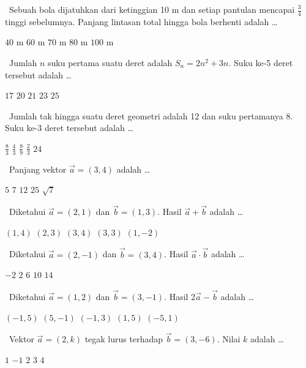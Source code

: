 \documentclass[11pt,a4paper]{exam}
\newcommand{\Fund}{{\footnotesize\textsf{\textcolor{hijau}{[Fundamental]}}}\ }
\newcommand{\Inter}{{\footnotesize\textsf{\textcolor{biru}{[Intermediate]}}}\ }
\newcommand{\Adv}{{\footnotesize\textsf{\textcolor{oranye}{[Advanced]}}}\ }
\newcommand{\Exp}{{\footnotesize\textsf{\textcolor{ungu}{[Expert]}}}\ }
\newcommand{\topik}[1]{%
  \par\addvspace{14pt}%
  \noindent{\large\bfseries\color{biru}#1}\par\addvspace{6pt}}
\begin{document}
\begin{questions}
\question \Adv Sebuah bola dijatuhkan dari ketinggian 10 m dan setiap pantulan
mencapai $\tfrac{3}{4}$ tinggi sebelumnya. Panjang lintasan total hingga bola
berhenti adalah \dots
\begin{choices}
\choice $40$ m \choice $60$ m \CorrectChoice $70$ m \choice $80$ m \choice $100$ m
\end{choices}

\question \Adv Jumlah $n$ suku pertama suatu deret adalah $S_n = 2n^{2} + 3n$.
Suku ke-5 deret tersebut adalah \dots
\begin{choices}
\choice $17$ \choice $20$ \CorrectChoice $21$ \choice $23$ \choice $25$
\end{choices}

\question \Exp Jumlah tak hingga suatu deret geometri adalah 12 dan suku
pertamanya 8. Suku ke-3 deret tersebut adalah \dots
\begin{choices}
\choice $\tfrac{8}{3}$ \choice $\tfrac{4}{3}$ \CorrectChoice $\tfrac{8}{9}$
\choice $\tfrac{2}{3}$ \choice $24$
\end{choices}

\topik{3. Vektor (8 Soal)}

\question \Fund Panjang vektor $\vec{a} = (3,4)$ adalah \dots
\begin{choices}
\CorrectChoice $5$ \choice $7$ \choice $12$ \choice $25$ \choice $\sqrt{7}$
\end{choices}

\question \Fund Diketahui $\vec{a} = (2,1)$ dan $\vec{b} = (1,3)$. Hasil $\vec{a} + \vec{b}$ adalah \dots
\begin{choices}
\choice $(1,4)$ \choice $(2,3)$ \CorrectChoice $(3,4)$ \choice $(3,3)$ \choice $(1,-2)$
\end{choices}

\question \Inter Diketahui $\vec{a} = (2,-1)$ dan $\vec{b} = (3,4)$. Hasil $\vec{a}\cdot\vec{b}$ adalah \dots
\begin{choices}
\choice $-2$ \CorrectChoice $2$ \choice $6$ \choice $10$ \choice $14$
\end{choices}

\question \Inter Diketahui $\vec{a} = (1,2)$ dan $\vec{b} = (3,-1)$. Hasil $2\vec{a} - \vec{b}$ adalah \dots
\begin{choices}
\CorrectChoice $(-1,5)$ \choice $(5,-1)$ \choice $(-1,3)$ \choice $(1,5)$ \choice $(-5,1)$
\end{choices}

\question \Inter Vektor $\vec{a} = (2,k)$ tegak lurus terhadap $\vec{b} = (3,-6)$. Nilai $k$ adalah \dots
\begin{choices}
\CorrectChoice $1$ \choice $-1$ \choice $2$ \choice $3$ \choice $4$
\end{choices}


\end{questions}
\end{document}
